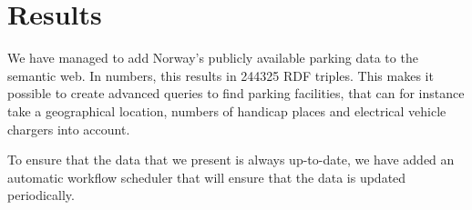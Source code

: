 \chapter{Results}
We have managed to add Norway's publicly available parking data to the semantic web. In numbers, this results in 244325 RDF triples. This makes it possible to create advanced queries to find parking facilities, that can for instance take a geographical location, numbers of handicap places and electrical vehicle chargers into account.

To ensure that the data that we present is always up-to-date, we have added an automatic workflow scheduler that will ensure that the data is updated periodically.
